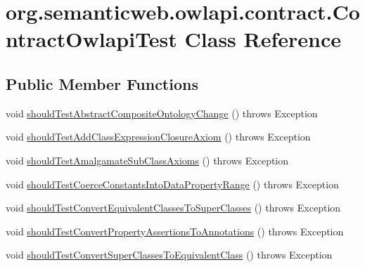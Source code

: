 \hypertarget{classorg_1_1semanticweb_1_1owlapi_1_1contract_1_1_contract_owlapi_test}{\section{org.\-semanticweb.\-owlapi.\-contract.\-Contract\-Owlapi\-Test Class Reference}
\label{classorg_1_1semanticweb_1_1owlapi_1_1contract_1_1_contract_owlapi_test}
}
\subsection*{Public Member Functions}
\begin{DoxyCompactItemize}
\item 
void \hyperlink{classorg_1_1semanticweb_1_1owlapi_1_1contract_1_1_contract_owlapi_test_a6f6d159db41e132609fea17c102c8d9e}{should\-Test\-Abstract\-Composite\-Ontology\-Change} ()  throws Exception 
\item 
void \hyperlink{classorg_1_1semanticweb_1_1owlapi_1_1contract_1_1_contract_owlapi_test_adb7a2ce0023b71877188f3ee7e1c2f80}{should\-Test\-Add\-Class\-Expression\-Closure\-Axiom} ()  throws Exception 
\item 
void \hyperlink{classorg_1_1semanticweb_1_1owlapi_1_1contract_1_1_contract_owlapi_test_a8db9dead129658147d6702a8a22190c8}{should\-Test\-Amalgamate\-Sub\-Class\-Axioms} ()  throws Exception 
\item 
void \hyperlink{classorg_1_1semanticweb_1_1owlapi_1_1contract_1_1_contract_owlapi_test_ad36702eea4a75f853717e37572be4f96}{should\-Test\-Coerce\-Constants\-Into\-Data\-Property\-Range} ()  throws Exception 
\item 
void \hyperlink{classorg_1_1semanticweb_1_1owlapi_1_1contract_1_1_contract_owlapi_test_abfcf59678abc66a27a2cf9b897460823}{should\-Test\-Convert\-Equivalent\-Classes\-To\-Super\-Classes} ()  throws Exception 
\item 
void \hyperlink{classorg_1_1semanticweb_1_1owlapi_1_1contract_1_1_contract_owlapi_test_a72334f28827dabb97ebf8dda280cdef8}{should\-Test\-Convert\-Property\-Assertions\-To\-Annotations} ()  throws Exception 
\item 
void \hyperlink{classorg_1_1semanticweb_1_1owlapi_1_1contract_1_1_contract_owlapi_test_aa72cceb131f9dbc80882e7d760f9a867}{should\-Test\-Convert\-Super\-Classes\-To\-Equivalent\-Class} ()  throws Exception 
\item 

\end{DoxyCompactItemize}
